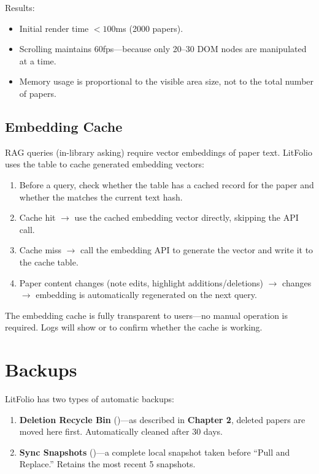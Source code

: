 Results:

\begin{itemize}
  \item Initial render time $< 100$ms (2000 papers).
  \item Scrolling maintains 60fps---because only 20--30 DOM nodes are manipulated at
    a time.
  \item Memory usage is proportional to the visible area size, not to the total number
    of papers.
\end{itemize}

\subsection{Embedding Cache}

RAG queries (in-library asking) require vector embeddings of paper text. LitFolio uses
the  table to cache generated embedding vectors:

\begin{enumerate}
  \item Before a query, check whether the  table has a cached
    record for the paper and whether the  matches the current text hash.
  \item Cache hit $\rightarrow$ use the cached embedding vector directly, skipping the
    API call.
  \item Cache miss $\rightarrow$ call the embedding API to generate the vector and write
    it to the cache table.
  \item Paper content changes (note edits, highlight additions/deletions) $\rightarrow$
     changes $\rightarrow$ embedding is automatically regenerated
    on the next query.
\end{enumerate}

The embedding cache is fully transparent to users---no manual operation is required.
Logs will show  or  to confirm
whether the cache is working.

\section{Backups}

LitFolio has two types of automatic backups:

\begin{enumerate}
  \item \textbf{Deletion Recycle Bin} ()---as described in
    \textbf{Chapter 2}, deleted papers are moved here first. Automatically cleaned
    after 30 days.
  \item \textbf{Sync Snapshots} ()---a complete local snapshot
    taken before ``Pull and Replace.'' Retains the most recent 5 snapshots.
\end{enumerate}

